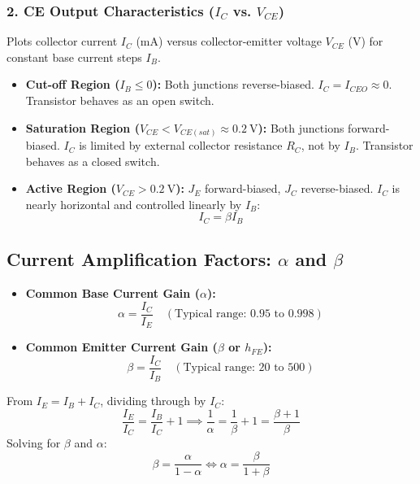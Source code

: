 \subsubsection{2. CE Output Characteristics ($I_C$ vs. $V_{CE}$)}
Plots collector current $I_C$ ($\si{\milli\ampere}$) versus collector-emitter voltage $V_{CE}$ ($\si{\volt}$) for constant base current steps $I_B$.
\begin{itemize}
    \item \textbf{Cut-off Region ($I_B \le 0$):} Both junctions reverse-biased. $I_C = I_{CEO} \approx 0$. Transistor behaves as an open switch.
    \item \textbf{Saturation Region ($V_{CE} < V_{CE(sat)} \approx \SI{0.2}{\volt}$):} Both junctions forward-biased. $I_C$ is limited by external collector resistance $R_C$, not by $I_B$. Transistor behaves as a closed switch.
    \item \textbf{Active Region ($V_{CE} > \SI{0.2}{\volt}$):} $J_E$ forward-biased, $J_C$ reverse-biased. $I_C$ is nearly horizontal and controlled linearly by $I_B$:
    \begin{equation}
        I_C = \beta I_B
    \end{equation}
\end{itemize}

\subsection{Current Amplification Factors: \texorpdfstring{$\alpha$ and $\beta$}{Alpha and Beta}}
\begin{itemize}
    \item \textbf{Common Base Current Gain ($\alpha$):}
    \begin{equation}
        \alpha = \frac{I_C}{I_E} \quad (\text{Typical range: } 0.95 \text{ to } 0.998)
    \end{equation}
    \item \textbf{Common Emitter Current Gain ($\beta$ or $h_{FE}$):}
    \begin{equation}
        \beta = \frac{I_C}{I_B} \quad (\text{Typical range: } 20 \text{ to } 500)
    \end{equation}
\end{itemize}

\begin{keyequation}
From $I_E = I_B + I_C$, dividing through by $I_C$:
\begin{equation}
    \frac{I_E}{I_C} = \frac{I_B}{I_C} + 1 \implies \frac{1}{\alpha} = \frac{1}{\beta} + 1 = \frac{\beta + 1}{\beta}
\end{equation}
Solving for $\beta$ and $\alpha$:
\begin{equation}
    \beta = \frac{\alpha}{1 - \alpha} \iff \alpha = \frac{\beta}{1 + \beta}
\end{equation}
\end{keyequation}

